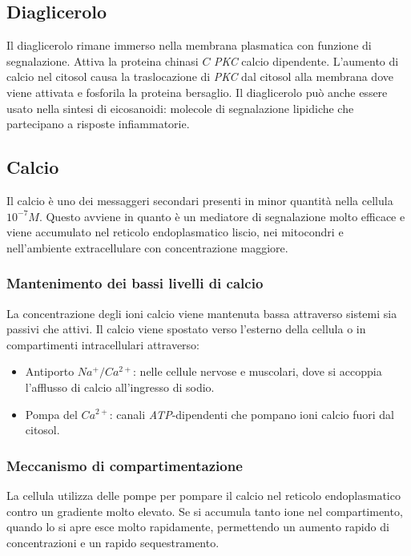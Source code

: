 	\subsection{Diaglicerolo}
	Il diaglicerolo rimane immerso nella membrana plasmatica con funzione di segnalazione.
	Attiva la proteina chinasi $C$ \emph{PKC} calcio dipendente.
	L'aumento di calcio nel citosol causa la traslocazione di \emph{PKC} dal citosol alla membrana dove viene attivata e fosforila la proteina bersaglio.
	Il diaglicerolo pu\`o anche essere usato nella sintesi di eicosanoidi: molecole di segnalazione lipidiche che partecipano a risposte infiammatorie.

	\subsection{Calcio}
	Il calcio \`e uno dei messaggeri secondari presenti in minor quantit\`a nella cellula $10^{-7}M$.
	Questo avviene in quanto \`e un mediatore di segnalazione molto efficace e viene accumulato nel reticolo endoplasmatico liscio, nei mitocondri e nell'ambiente extracellulare con concentrazione maggiore.


		\subsubsection{Mantenimento dei bassi livelli di calcio}
		La concentrazione degli ioni calcio viene mantenuta bassa attraverso sistemi sia passivi che attivi.
		Il calcio viene spostato verso l'esterno della cellula o in compartimenti intracellulari attraverso:
		\begin{multicols}{2}
			\begin{itemize}
				\item Antiporto \emph{$Na^+/Ca^{2+}$}: nelle cellule nervose e muscolari, dove si accoppia l'afflusso di calcio all'ingresso di sodio.
				\item Pompa del \emph{$Ca^{2+}$}: canali \emph{ATP}-dipendenti che pompano ioni calcio fuori dal citosol.
			\end{itemize}
		\end{multicols}

		\subsubsection{Meccanismo di compartimentazione}
		La cellula utilizza delle pompe per pompare il calcio nel reticolo endoplasmatico contro un gradiente molto elevato.
		Se si accumula tanto ione nel compartimento, quando lo si apre esce molto rapidamente, permettendo un aumento rapido di concentrazioni e un rapido sequestramento.

